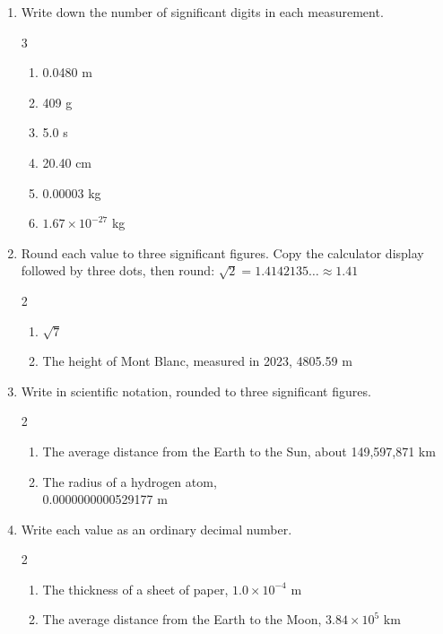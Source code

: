 \documentclass[12pt, twoside]{article}
\begin{document}
\begin{enumerate}[itemsep=0.8cm]

\item Write down the number of significant digits in each measurement.
  \begin{multicols}{3}
    \begin{enumerate}[itemsep=0.5cm]
      \item 0.0480 m
      \item 409 g
      \item 5.0 s
      \item 20.40 cm
      \item \num{0.00003} kg
      \item $1.67 \times 10^{-27}$ kg
    \end{enumerate}
  \end{multicols} \vspace{0.3cm}

\item Round each value to three significant figures. Copy the calculator display
  followed by three dots, then round: $\sqrt{2} = 1.4142135\ldots \approx 1.41$
  \begin{multicols}{2}
    \raggedright
    \begin{enumerate}
      \item $\sqrt{7}$
      \item The height of Mont Blanc, measured in 2023, 4805.59 m
    \end{enumerate}
  \end{multicols} \vspace{1.6cm}

\item Write in scientific notation, rounded to three significant figures.
  \begin{multicols}{2}
    \raggedright
    \begin{enumerate}
      \item The average distance from the Earth to the Sun, about
        149{,}597{,}871 km
      \item The radius of a hydrogen atom, \\
        \num{0.0000000000529177} m
    \end{enumerate}
  \end{multicols} \vspace{1.6cm}

\item Write each value as an ordinary decimal number.
  \begin{multicols}{2}
    \raggedright
    \begin{enumerate}
      \item The thickness of a sheet of paper, $1.0 \times 10^{-4}$ m
      \item The average distance from the Earth to the Moon, $3.84 \times 10^{5}$ km
    \end{enumerate}
  \end{multicols}


\end{enumerate}
\end{document}
